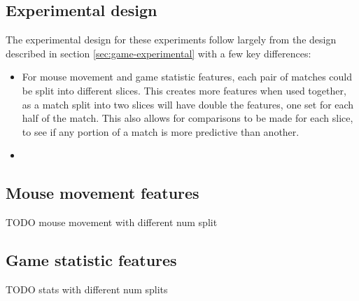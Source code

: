 \documentclass[Report.tex]{subfiles}
\newcommand{\newaxis}[7]{
\begin{axis}[
    ybar,
    title={#1},
    width=#5,
    height=#6,
    ymin=#3, ymax=#4,
    bar width=1em,
    legend style={at={#7},anchor=north,legend columns=-1},
    enlarge x limits=0.4,
    x tick label style={align=center,text width=1.7cm},
    symbolic x coords={Logistic Regression, Random Forest, Multi-layer Perceptron},
    xtick=data,
    ylabel={#2}
]
}
\begin{document}
\subsection{Experimental design}
The experimental design for these experiments follow largely from the design described in section \ref{sec:game-experimental} with a few key differences:
\begin{itemize}
\item For mouse movement and game statistic features, each pair of matches could be split into different slices. This creates more features when used together, as a match split into two slices will have double the features, one set for each half of the match. This also allows for comparisons to be made for each slice, to see if any portion of a match is more predictive than another. 
\item 
\end{itemize}

\subsection{Mouse movement features}

TODO mouse movement with different num split

\begin{figure}[H]
\centering
{}
\end{figure}

\subsection{Game statistic features}
TODO stats with different num splits

\begin{figure}[H]
\centering
{}
\end{figure}
\end{document}
